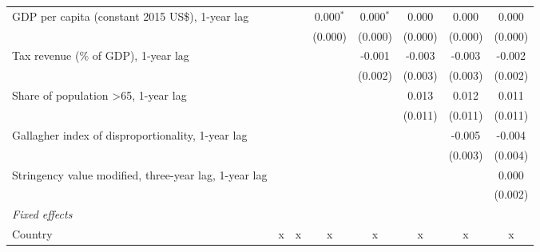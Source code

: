 \begin{tabular}{lccccccc}
   GDP per capita (constant 2015 US\$), 1-year lag                                    &                &                & 0.000$^{*}$    & 0.000$^{*}$    & 0.000         & 0.000         & 0.000\\   
                                                                                      &                &                & (0.000)        & (0.000)        & (0.000)       & (0.000)       & (0.000)\\   
   Tax revenue (\% of GDP), 1-year lag                                                &                &                &                & -0.001         & -0.003        & -0.003        & -0.002\\   
                                                                                      &                &                &                & (0.002)        & (0.003)       & (0.003)       & (0.002)\\   
   Share of population >65, 1-year lag                                                &                &                &                &                & 0.013         & 0.012         & 0.011\\   
                                                                                      &                &                &                &                & (0.011)       & (0.011)       & (0.011)\\   
   Gallagher index of disproportionality, 1-year lag                                  &                &                &                &                &               & -0.005        & -0.004\\   
                                                                                      &                &                &                &                &               & (0.003)       & (0.004)\\   
   Stringency value modified, three-year lag, 1-year lag                              &                &                &                &                &               &               & 0.000\\   
                                                                                      &                &                &                &                &               &               & (0.002)\\   
   \emph{Fixed effects}\\
   Country                                                                            & x              & x              & x              & x              & x             & x             & x\\  

\end{tabular}

